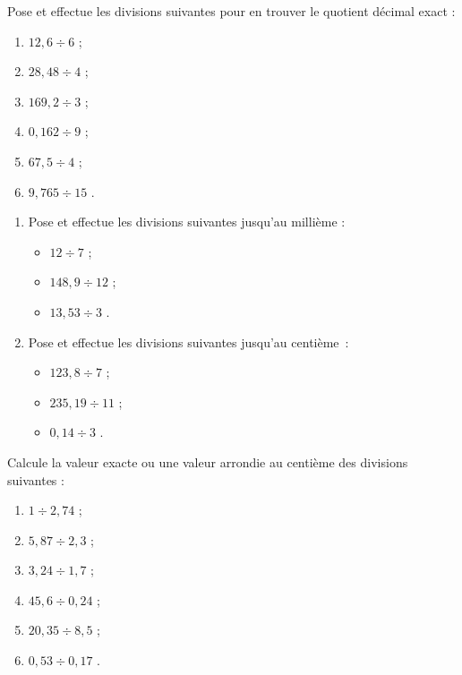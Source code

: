 \begin{exercice} 
Pose et effectue les divisions suivantes pour en trouver le quotient décimal exact :
\begin{enumerate} 
 \item $ 12,6 \div 6$ \dotfill ; 
 
 \item $ 28,48 \div 4$ \dotfill ; 

 \item $ 169,2 \div 3$ \dotfill ; 

 \item $ 0,162 \div 9$ \dotfill ; 

 \item $ 67,5 \div 4$ \dotfill ; 

 \item $ 9,765 \div 15$ \dotfill. 
 \end{enumerate}
\end{exercice}


\begin{exercice} 
\begin{enumerate} 
 \item Pose et effectue les divisions suivantes jusqu'au millième :
 \begin{itemize}
  \item $12 \div 7$ \dotfill ; 
  
  \item $148,9 \div 12$ \dotfill ; 
  
  \item $13,53 \div 3$ \dotfill. 
  \end{itemize}
 \item Pose et effectue les divisions suivantes jusqu'au centième :
  \begin{itemize}
  \item $123,8 \div 7$ \dotfill ; 
  
  \item $235,19 \div 11$ \dotfill ; 
  
  \item $0,14 \div 3$ \dotfill. 
  \end{itemize}
 \end{enumerate}
\end{exercice}


\begin{exercice} 
Calcule la valeur exacte ou une valeur arrondie au centième des divisions suivantes :
\begin{enumerate} 
 \item $1 \div 2,74$ \dotfill ; 

 \item $5,87 \div 2,3$ \dotfill ; 

 \item $3,24 \div 1,7$ \dotfill ; 

 \item $45,6 \div 0,24$ \dotfill ; 

 \item $20,35 \div 8,5$ \dotfill ; 

 \item $0,53 \div 0,17$ \dotfill. 
 \end{enumerate}
\end{exercice}


